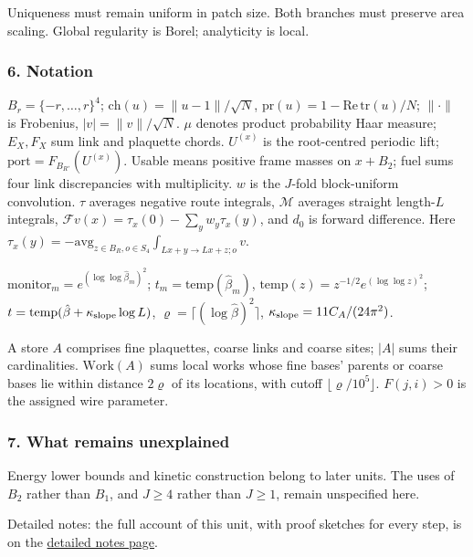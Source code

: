 \documentclass[
  letterpaper,
  11pt]{article}
\begin{document}
Uniqueness must remain uniform in patch size. Both branches must
preserve area scaling. Global regularity is Borel; analyticity is local.

\subsubsection{6. Notation}\label{notation-3}

\(B_r=\{-r,\ldots,r\}^4\); \(\mathrm{ch}(u)=\|u-1\|/\sqrt N\),
\(\mathrm{pr}(u)=1-\mathrm{Re\,tr}(u)/N\); \(\|\cdot\|\) is Frobenius,
\(|v|=\|v\|/\sqrt N\). \(\mu\) denotes product probability Haar measure;
\(E_X,F_X\) sum link and plaquette chords. \(U^{(x)}\) is the
root-centred periodic lift; \(\mathrm{port}=F_{B_{R'}}(U^{(x)})\).
Usable means positive frame masses on \(x+B_2\); fuel sums four link
discrepancies with multiplicity. \(w\) is the \(J\)-fold block-uniform
convolution. \(\tau\) averages negative route integrals, \(\mathcal M\)
averages straight length-\(L\) integrals,
\(\mathcal Fv(x)=\tau_x(0)-\sum_yw_y\tau_x(y)\), and \(d_0\) is forward
difference. Here
\(\tau_x(y)=-\mathrm{avg}_{z\in B_R,o\in S_4}\int_{Lx+y\to Lx+z;o}v\).

\(\mathrm{monitor}_m=e^{(\log\log\hat\beta_m)^2}\);
\(t_m=\mathrm{temp}(\hat\beta_m)\),
\(\mathrm{temp}(z)=z^{-1/2}e^{(\log\log z)^2}\);
\(t=\mathrm{temp}(\hat\beta+\kappa_{\rm slope}\log L)\),
\(\varrho=\lceil(\log\hat\beta)^2\rceil\),
\(\kappa_{\rm slope}=11C_A/(24\pi^2)\).

A store \(A\) comprises fine plaquettes, coarse links and coarse sites;
\(|A|\) sums their cardinalities. \(\mathrm{Work}(A)\) sums local works
whose fine bases' parents or coarse bases lie within distance
\(2\varrho\) of its locations, with cutoff
\(\lfloor\varrho/10^5\rfloor\). \(F(j,i)>0\) is the assigned wire
parameter.

\subsubsection{7. What remains
unexplained}\label{what-remains-unexplained-3}

Energy lower bounds and kinetic construction belong to later units. The
uses of \(B_2\) rather than \(B_1\), and \(J\ge4\) rather than
\(J\ge1\), remain unspecified here.

Detailed notes: the full account of this unit, with proof sketches for
every step, is on the
\href{https://github.com/scottnarmstrong/yang-mills-informalization/blob/main/outline/notes/III-1.md}{detailed
notes page}.
\end{document}
